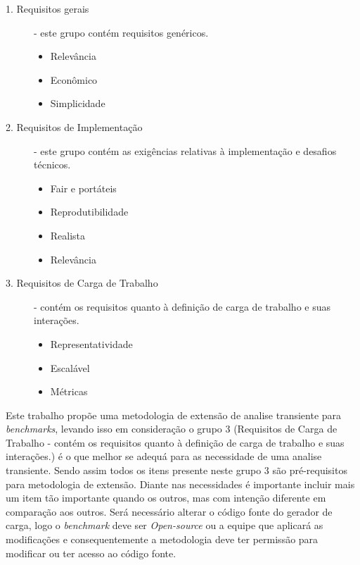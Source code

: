 \begin{description}
	\item[1. Requisitos gerais] - este grupo contém requisitos genéricos. 
	\begin{itemize}
		\item Relevância
		\item Econômico
		\item Simplicidade
	\end{itemize}
	
	\item[2. Requisitos de Implementação] - este grupo contém as exigências relativas à implementação e desafios técnicos. \hfill 
	\begin{itemize}
		\item Fair e portáteis
		\item Reprodutibilidade
		\item Realista
		\item Relevância
	\end{itemize}
	
	\item[3. Requisitos de Carga de Trabalho ] - contém os requisitos quanto à definição de carga de trabalho e suas interações. \hfill 
	\begin{itemize}
		\item Representatividade
		\item Escalável
		\item Métricas
	\end{itemize}
	
\end{description}

Este trabalho propõe uma metodologia de extensão de analise transiente para \textit{benchmarks}, levando isso em consideração o grupo 3 (Requisitos de Carga de Trabalho - contém os requisitos quanto à definição de carga de trabalho e suas interações.) é o que melhor se adequá para as necessidade de uma analise transiente. Sendo assim todos os itens presente neste grupo 3 são pré-requisitos para metodologia de extensão. 
Diante nas necessidades é importante incluir mais um item tão importante quando os outros, mas com intenção diferente em comparação aos outros. Será necessário alterar o código fonte do gerador de carga, logo o \textit{benchmark} deve ser \textit{Open-source} ou a equipe que aplicará as modificações e consequentemente a metodologia deve ter permissão para modificar ou ter acesso ao código fonte.



